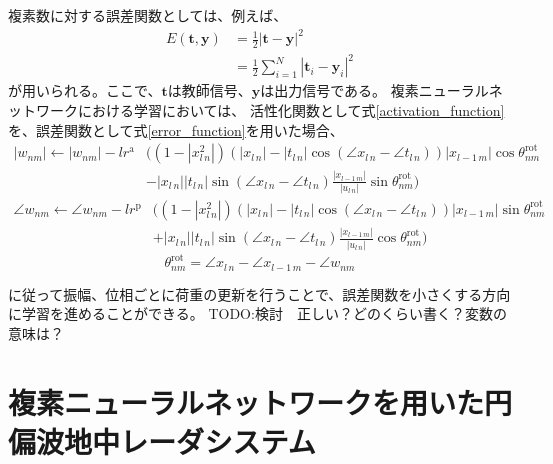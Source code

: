 \documentclass[11pt,a4paper,uplatex,draft]{ujarticle}
\begin{document}
    複素数に対する誤差関数としては、例えば、
    \begin{equation}\label{error_function}
      \begin{split}
      E(\bm{t}, \bm{y})  & = \frac{1}{2}|\bm{t} - \bm{y}|^2\\
      & = \frac{1}{2}\sum_{i=1}^{N}|\bm{t}_i - \bm{y}_i|^2
      \end{split}
    \end{equation}
    が用いられる。ここで、$\bm{t}$は教師信号、$\bm{y}$は出力信号である。
    複素ニューラルネットワークにおける学習においては、
    活性化関数として式\ref{activation_function}を、誤差関数として式\ref{error_function}を用いた場合、
    \begin{equation}
      \label{eq:update_a}
      \begin{split}
        |w_{nm}| \leftarrow |w_{nm}| - lr^\mathrm{a} & \biggl( (1-|x_{l\,n}^2|)(|x_{l\, n}| - |t_{l\, n}| \cos (\angle x_{l\, n} - \angle t_{l\, n}))|x_{l-1\, m}| \cos \theta^{\mathrm{rot}}_{nm}  \\
                        & - |x_{l\, n}| |t_{l\, n}| \sin (\angle x_{l\, n} - \angle t_{l\, n}) \frac{|x_{l-1\, m}|}{|u_{l\, n}|} \sin \theta^{\mathrm{rot}}_{nm} \biggr)
      \end{split}
    \end{equation}
    \begin{equation}
      \label{eq:update_p}
      \begin{split}
        \angle w_{nm} \leftarrow \angle w_{nm} - lr^\mathrm{p} & \bigg( (1-|x_{l\,n}^2|)(|x_{l\, n}| - |t_{l\, n}| \cos (\angle x_{l\, n} - \angle t_{l\, n}))|x_{l-1\, m}| \sin \theta^{\mathrm{rot}}_{nm} \\
                        &  + |x_{l\, n}| |t_{l\, n}| \sin (\angle x_{l\, n} - \angle t_{l\, n}) \frac{|x_{l-1\, m}|}{|u_{l\, n}|} \cos \theta^{\mathrm{rot}}_{nm} \bigg)
      \end{split}
    \end{equation}
    \begin{equation}
      \label{eq:rot}
        \theta^{\mathrm{rot}}_{nm} = \angle x_{l\, n} - \angle x_{l-1\, m} -\angle w_{nm}
    \end{equation}

    に従って振幅、位相ごとに荷重の更新を行うことで、誤差関数を小さくする方向に学習を進めることができる。\cite{CVNN}
    TODO:検討　正しい？どのくらい書く？変数の意味は？



\section{複素ニューラルネットワークを用いた円偏波地中レーダシステム}
\end{document}
